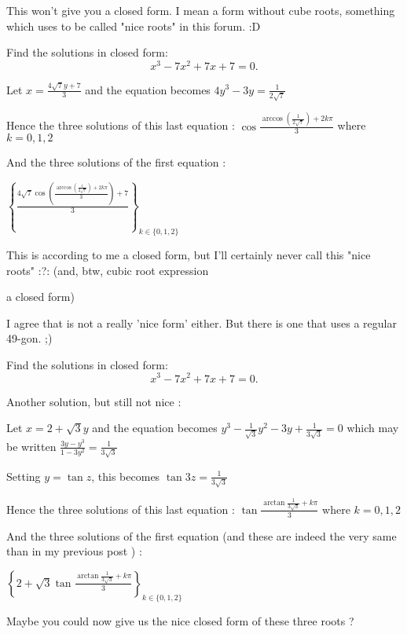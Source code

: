 \begin{solution}
	This won't give you a closed form. I mean a form without cube roots, something which uses to be called "nice roots" in this forum. :D
\end{solution}



\begin{solution}
	\begin{tcolorbox}Find the solutions in closed form:
\[x^{3}-7x^{2}+7x+7=0. \]\end{tcolorbox}
Let $x=\frac{4\sqrt 7y+7}3$ and the equation becomes $4y^3-3y=\frac 1{2\sqrt 7}$

Hence the three solutions of this last equation : $\cos\frac{\arccos\left(\frac 1{2\sqrt 7}\right)+2k\pi}3$ where $k=0,1,2$

And the three solutions of the first equation : 

$\boxed{\left\{\frac{4\sqrt 7\cos\left(\frac{\arccos\left(\frac 1{2\sqrt 7}\right)+2k\pi}3\right)+7}3\right\}_{k\in\{0,1,2\}}}$ 

This is according to me a closed form, but I'll certainly never call this "nice roots" :?:
(and, btw, cubic root expression a closed form)
\end{solution}



\begin{solution}
	I agree that is not a really 'nice form' either. But there is one that uses a regular 49-gon. ;)
\end{solution}



\begin{solution}
	\begin{tcolorbox}Find the solutions in closed form:
\[x^{3}-7x^{2}+7x+7=0. \]\end{tcolorbox}
Another solution, but still not nice :

Let $x=2+\sqrt 3y$ and the equation becomes $y^3-\frac 1{\sqrt 3}y^2-3y+\frac 1{3\sqrt 3}=0$ which may be written $\frac{3y-y^3}{1-3y^2}=\frac 1{3\sqrt 3}$

Setting $y=\tan z$, this becomes $\tan 3z=\frac 1{3\sqrt 3}$

Hence the three solutions of this last equation : $\tan\frac{\arctan\frac 1{3\sqrt 3}+k\pi}3$ where $k=0,1,2$

And the three solutions of the first equation (and these are indeed the very same than in my previous post ) :

$\boxed{\left\{2+\sqrt 3\tan\frac{\arctan\frac 1{3\sqrt 3}+k\pi}3\right\}_{k\in\{0,1,2\}}}$

Maybe you could now give us the nice closed form of these three roots ?
\end{solution}



